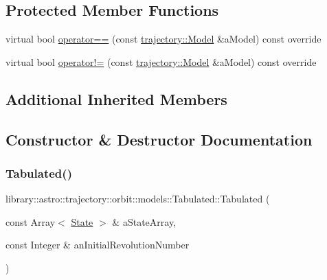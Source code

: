 \subsection*{Protected Member Functions}
\begin{DoxyCompactItemize}
\item 
virtual bool \hyperlink{classlibrary_1_1astro_1_1trajectory_1_1orbit_1_1models_1_1_tabulated_a7194a96e062cb6a8c109c82e169a9d7d}{operator==} (const \hyperlink{classlibrary_1_1astro_1_1trajectory_1_1_model}{trajectory\+::\+Model} \&a\+Model) const override
\item 
virtual bool \hyperlink{classlibrary_1_1astro_1_1trajectory_1_1orbit_1_1models_1_1_tabulated_a4373b98c6026c999da98e1740c784e17}{operator!=} (const \hyperlink{classlibrary_1_1astro_1_1trajectory_1_1_model}{trajectory\+::\+Model} \&a\+Model) const override
\end{DoxyCompactItemize}
\subsection*{Additional Inherited Members}


\subsection{Constructor \& Destructor Documentation}
\mbox{\label{classlibrary_1_1astro_1_1trajectory_1_1orbit_1_1models_1_1_tabulated_a9110680d47c9dcf4272432aa4b299947}} 
\subsubsection{\texorpdfstring{Tabulated()}{Tabulated()}}
{\footnotesize\ttfamily library\+::astro\+::trajectory\+::orbit\+::models\+::\+Tabulated\+::\+Tabulated (\begin{DoxyParamCaption}\item[{const Array$<$ \hyperlink{classlibrary_1_1astro_1_1trajectory_1_1_state}{State} $>$ \&}]{a\+State\+Array,  }\item[{const Integer \&}]{an\+Initial\+Revolution\+Number }\end{DoxyParamCaption})}




